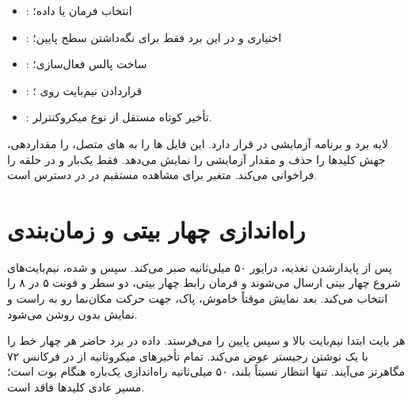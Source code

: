 \begin{itemize}
  \item {}: انتخاب فرمان یا داده؛
  \item {}: اختیاری و در این برد فقط برای نگه‌داشتن سطح پایین؛
  \item {}: ساخت پالس فعال‌سازی؛
  \item {}: قراردادن نیم‌بایت روی ؛
  \item {}: تأخیر کوتاه مستقل از نوع میکروکنترلر.
\end{itemize}

لایه برد و برنامه آزمایشی در
قرار دارد. این فایل ها را به های  متصل،  را مقداردهی، جهش کلیدها را حذف و مقدار آزمایشی را نمایش می‌دهد.  فقط یک‌بار  و در حلقه  را فراخوانی می‌کند. متغیر
برای مشاهده مستقیم در  در دسترس است.

\section{راه‌اندازی چهار بیتی و زمان‌بندی}
پس از پایدارشدن تغذیه، درایور ۵۰ میلی‌ثانیه صبر می‌کند. سپس  و  شده، نیم‌بایت‌های شروع چهار بیتی ارسال می‌شوند و فرمان  رابط چهار بیتی، دو سطر و فونت ۵ در ۸ را انتخاب می‌کند. بعد نمایش موقتاً خاموش،  پاک، جهت حرکت مکان‌نما رو به راست و نمایش بدون  روشن می‌شود.

هر بایت ابتدا نیم‌بایت بالا و سپس پایین را می‌فرستد.  داده در برد حاضر هر چهار خط را با یک نوشتن رجیستر  عوض می‌کند. تمام تأخیرهای میکروثانیه از  در فرکانس ۷۲ مگاهرتز می‌آیند. تنها انتظار نسبتاً بلند، ۵۰ میلی‌ثانیه راه‌اندازی یک‌باره هنگام بوت است؛ مسیر عادی کلیدها فاقد  است.

